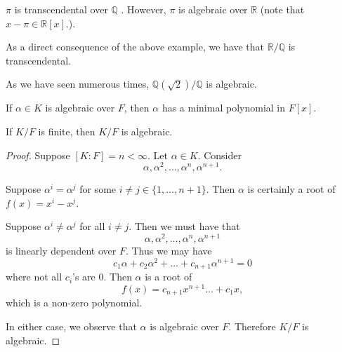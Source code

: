 \documentclass[notoc,notitlepage]{tufte-book}
\begin{document}
\begin{eg}
  $\pi$ is transcendental over $\mathbb{Q}$ . However, $\pi$ is algebraic over $\mathbb{R}$ (note that $x - \pi \in \mathbb{R}[x]$.).
\end{eg}

\begin{eg}
  As a direct consequence of the above example, we have that $\mathbb{R}/\mathbb{Q}$ is transcendental.
\end{eg}

\begin{eg}
  As we have seen numerous times, $\mathbb{Q}(\sqrt{2}) / \mathbb{Q}$ is algebraic.
\end{eg}

\begin{remark}
  If $\alpha \in K$ is algebraic over $F$, then $\alpha$ has a minimal polynomial in $F[x]$.
\end{remark}

\begin{thm}\label{thm:finite_extensions_are_algebraic}
  If $K / F$ is finite, then $K / F$ is algebraic.
\end{thm}

\begin{proof}
  Suppose $[K : F] = n < \infty$. Let $\alpha \in K$. Consider
  \begin{equation*}
    \alpha, \alpha^2, \ldots, \alpha^n, \alpha^{n + 1}.
  \end{equation*}

  \noindent
   Suppose $\alpha^i = \alpha^j$ for some $i \neq j \in \{ 1, \ldots, n + 1\}$. Then
  $\alpha$ is certainly a root of $f(x) = x^i - x^j$.

  \noindent
   Suppose $\alpha^i \neq \alpha^j$ for all $i \neq j$. Then we must have that
  \begin{equation*}
    \alpha, \alpha^2, \ldots, \alpha^n, \alpha^{n + 1}
  \end{equation*}
  is linearly dependent over $F$. Thus we may have
  \begin{equation*}
    c_1 \alpha + c_2 \alpha^2 + \hdots + c_{n + 1} \alpha^{n + 1} = 0
  \end{equation*}
  where not all $c_i$'s are $0$. Then $\alpha$ is a root of
  \begin{equation*}
    f(x) = c_{ n + 1 } x^{n + 1} \hdots + c_1 x,
  \end{equation*}
  which is a non-zero polynomial.

  In either case, we observe that $\alpha$ is algebraic over $F$. Therefore $K / F$ is algebraic.
\end{proof}
\end{document}
